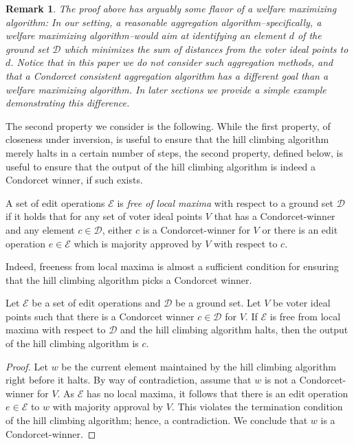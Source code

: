 \documentclass[sigconf]{aamas}  %
\newtheorem{remark}{Remark}
\newcommand{\calD}{\mathcal{D}}
\newcommand{\calE}{\mathcal{E}}
\begin{document}
\begin{remark}
%
The proof above has arguably some flavor of a welfare maximizing algorithm:
  In our setting, a reasonable aggregation algorithm--specifically, a welfare maximizing algorithm--would aim at identifying an element $d$ of the ground set $\calD$ which minimizes the sum of distances
  from the voter ideal points to $d$.
Notice that in this paper we do not consider such aggregation methods, and that a Condorcet consistent aggregation algorithm has a different goal than a welfare maximizing algorithm.
In later sections we provide a simple example demonstrating this difference.
%
\end{remark}

The second property we consider is the following.
While the first property, of closeness under inversion, is useful to ensure that the hill climbing algorithm merely halts in a certain number of steps,
the second property, defined below, is useful to ensure that the output of the hill climbing algorithm is indeed a Condorcet winner, if such exists.

\begin{definition}
%
A set of edit operations $\calE$ is \emph{free of local maxima} with respect to a ground set $\calD$ if it holds that for any set of voter ideal points $V$ that has a Condorcet-winner
and any element $c \in \calD$, either $c$ is a Condorcet-winner for $V$ or there is an edit operation $e \in \calE$ which is majority approved by $V$ with respect to $c$.
%
\end{definition}

Indeed, freeness from local maxima is almost a sufficient condition for ensuring that the hill climbing algorithm picks a Condorcet winner.

\begin{lemma}\label{lemma:IIAV-epsilon-condorcet}
  Let $\calE$ be a set of edit operations and $\calD$ be a ground set.
  Let $V$ be voter ideal points such that there is a Condorcet winner $c \in \calD$ for $V$.
  If $\calE$ is free from local maxima with respect to $\calD$ and the hill climbing algorithm halts,
  then the output of the hill climbing algorithm is $c$.
\end{lemma}

\begin{proof}
%
Let $w$ be the current element maintained by the hill climbing algorithm right before it halts.
By way of contradiction, assume that $w$ is not a Condorcet-winner for $V$.
As $\calE$ has no local maxima, it follows that there is an edit operation $e \in \calE$ to $w$ with majority approval by $V$.
This violates the termination condition of the hill climbing algorithm; hence, a contradiction.
We conclude that $w$ is a Condorcet-winner.
%
\end{proof}
\end{document}
